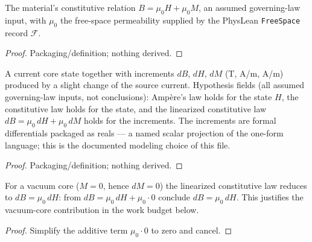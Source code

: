 \begin{definition}[Constitutive law $B = \mu_0(H+M)$]
\label{def:IPhO2026Problems_problem_IPhO_2026_3_A_3:ConstitutiveBH}
The material's constitutive relation $B = \mu_0 H + \mu_0 M$, an assumed
governing-law input, with $\mu_0$ the free-space permeability supplied by
the PhysLean \texttt{FreeSpace} record $\mathcal{F}$.
\end{definition}
\begin{proof}
Packaging/definition; nothing derived.
\end{proof}

\begin{definition}
\label{def:IPhO2026Problems_problem_IPhO_2026_3_A_3:PmTVariation}
A current core state together with increments $dB$, $dH$, $dM$ (T, A/m,
A/m) produced by a slight change of the source current. Hypothesis fields
(all assumed governing-law inputs, not conclusions): Ampère's law holds for
the state $H$, the constitutive law holds for the state, and the linearized
constitutive law $dB = \mu_0\,dH + \mu_0\,dM$ holds for the increments.
The increments are formal differentials packaged as reals — a named scalar
projection of the one-form language; this is the documented modeling choice
of this file.
\end{definition}
\begin{proof}
Packaging/definition; nothing derived.
\end{proof}

\begin{lemma}
\label{lem:IPhO2026Problems_problem_IPhO_2026_3_A_3:dB_of_vacuum_core}
For a vacuum core ($M = 0$, hence $dM = 0$) the linearized constitutive law
reduces to $dB = \mu_0\,dH$: from $dB = \mu_0\,dH + \mu_0\cdot 0$ conclude
$dB = \mu_0\,dH$. This justifies the vacuum-core contribution in the work
budget below.
\end{lemma}
\begin{proof}
Simplify the additive term $\mu_0\cdot 0$ to zero and cancel.
\end{proof}

